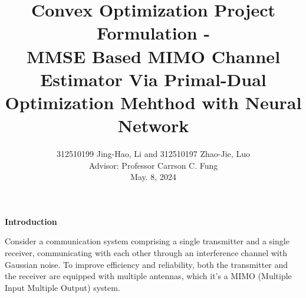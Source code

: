 \documentclass[a4paper, onecolumn, 11pt]{IEEEtran}
\begin{document}


    \title{ Convex Optimization Project Formulation -\\
    \huge  MMSE Based MIMO Channel Estimator Via Primal-Dual
    Optimization Mehthod with Neural Network}
    \author{312510199 Jing-Hao, Li and 312510197 Zhao-Jie, Luo\\
        Advisor: Professor Carrson C. Fung\\
        \small{May. 8, 2024}}


    \maketitle





    \noindent \textbf{Introduction}

        Consider a communication system comprising a single transmitter and a single receiver, communicating with each other through an interference channel with 
        Gaussian noise. To improve efficiency and reliability, both the transmitter and the receiver are equipped with multiple antennas, which it's a MIMO 
        (Multiple Input Multiple Output) system.
\end{document}
